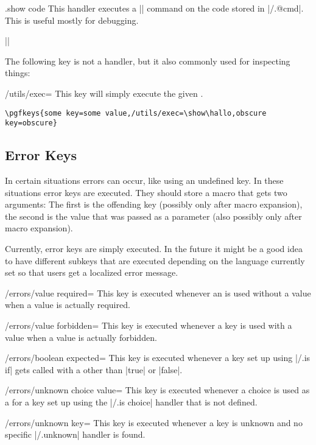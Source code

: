 \begin{handler}{{.show code}}
    This handler executes a |\show| command on the code stored in
    |/.@cmd|. This is useful mostly for debugging.

    \example ||
\end{handler}

The following key is not a handler, but it also commonly used for inspecting
things:
%
\begin{key}{/utils/exec=}
    This key will simply execute the given .

    \example \verb|\pgfkeys{some key=some value,/utils/exec=\show\hallo,obscure key=obscure}|
\end{key}


\subsection{Error Keys}

In certain situations errors can occur, like using an undefined key. In these
situations error keys are executed. They should store a macro that gets two
arguments: The first is the offending key (possibly only after macro
expansion), the second is the value that was passed as a parameter (also
possibly only after macro expansion).

Currently, error keys are simply executed. In the future it might be a good
idea to have different subkeys that are executed depending on the language
currently set so that users get a localized error message.

\begin{key}{/errors/value required=}
    This key is executed whenever an  is used without a
    value when a value is actually required.
\end{key}

\begin{key}{/errors/value forbidden=}
    This key is executed whenever a key is used with a value when a value is
    actually forbidden.
\end{key}

\begin{key}{/errors/boolean expected=}
    This key is executed whenever a key set up using |/.is if| gets called with
    a  other than |true| or |false|.
\end{key}

\begin{key}{/errors/unknown choice value=}
    This key is executed whenever a choice is used as a  for a key
    set up using the |/.is choice| handler that is not defined.
\end{key}

\begin{key}{/errors/unknown key=}
    This key is executed whenever a key is unknown and no specific |/.unknown|
    handler is found.
\end{key}



